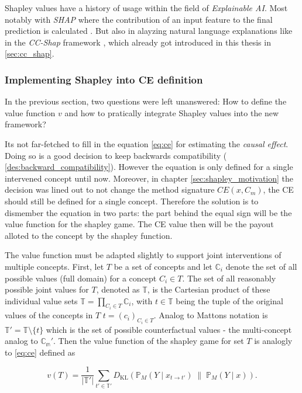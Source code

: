 Shapley values have a history of usage within the field of \emph{Explainable AI}. Most notably with \emph{SHAP} where the contribution of an input feature to the final prediction is calculated \cite{lundbergUnifiedApproachInterpreting2017}. But also in alayzing natural language explanations like in the \emph{CC-Shap} framework \cite{parcalabescuMeasuringFaithfulnessSelfconsistency2024}, which already got introduced in this thesis in \ref{sec:cc_shap}.

\subsubsection{Implementing Shapley into CE definition}
In the previous section, two questions were left unanswered: How to define the value function $v$ and how to pratically integrate Shapley values into the new framework?

Its not far-fetched to fill in the equation \ref{eq:ce} for estimating the \emph{causal effect}. Doing so is a good decision to keep backwards compatibility ( \ref{des:backward_compatibility}). However the equation is only defined for a single intervened concept until now. Moreover, in chapter \ref{sec:shapley_motivation} the decision was lined out to not change the method signature $CE(x,C_m)$, the CE should still be defined for a single concept. Therefore the solution is to dismember the equation in two parts: the part behind the equal sign will be the value function for the shapley game. The CE value then will be the payout alloted to the concept by the shapley function.

The value function must be adapted slightly to support joint interventions of multiple concepts. First, let $T$ be a set of concepts  and let $\mathbb{C}_i$ denote the set of all possible values (full domain) for a concept $C_i \in T$. The set of all reasonably possible joint values for $T$, denoted as $\mathbb{T}$, is the Cartesian product of these individual value sets $\mathbb{T} = \prod_{C_i \in T} \mathbb{C}_i$, with $t \in \mathbb{T}$ being the tuple of the original values of the concepts in $T$ $t = (c_i)_{C_i \in T}$. Analog to Mattons notation is $\mathbb{T}' = \mathbb{T} \setminus \{t\}$ which is the set of possible counterfactual values - the multi-concept analog to $\mathbb{C_m}'$.
Then the value function of the shapley game for set $T$ is analogly to \ref{eq:ce} defined as

\begin{equation}
\label{eq:value_function}
v(T)=\frac{1}{|\mathbb{T}'|}
\sum_{t' \in \mathbb{T}'}
D_{\mathrm{KL}}
\left(
\mathbb{P}_M(Y \mid x_{t \rightarrow t'})
\;\middle\|\;
\mathbb{P}_M(Y \mid x)
\right).
\end{equation}

